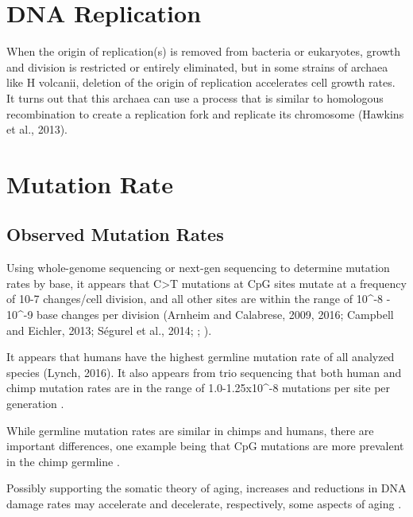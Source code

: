 \documentclass[]{book}
\begin{document}
\hypertarget{dna-replication}{%
\section{DNA Replication}\label{dna-replication}}

When the origin of replication(s) is removed from bacteria or eukaryotes, growth and division is restricted or entirely eliminated, but in some strains of archaea like H volcanii, deletion of the origin of replication accelerates cell growth rates. It turns out that this archaea can use a process that is similar to homologous recombination to create a replication fork and replicate its chromosome (Hawkins et al., 2013).

\hypertarget{mutation-rate}{%
\section{Mutation Rate}\label{mutation-rate}}

\hypertarget{observed-mutation-rates}{%
\subsection{Observed Mutation Rates}\label{observed-mutation-rates}}

Using whole-genome sequencing or next-gen sequencing to determine mutation rates by base, it appears that C\textgreater{}T mutations at CpG sites mutate at a frequency of 10-7 changes/cell division, and all other sites are within the range of 10\^{}-8 - 10\^{}-9 base changes per division (Arnheim and Calabrese, 2009, 2016; Campbell and Eichler, 2013; Ségurel et al., 2014; \citet{kong2012rate}; \citet{segurel2014determinants}).

It appears that humans have the highest germline mutation rate of all analyzed species (Lynch, 2016). It also appears from trio sequencing that both human and chimp mutation rates are in the range of 1.0-1.25x10\^{}-8 mutations per site per generation \citep{kong2012rate}.

While germline mutation rates are similar in chimps and humans, there are important differences, one example being that CpG mutations are more prevalent in the chimp germline \citep{venn2014strong}.

Possibly supporting the somatic theory of aging, increases and reductions in DNA damage rates may accelerate and decelerate, respectively, some aspects of aging \citep{behjati2014genome, altieri2008dna}.
\end{document}
